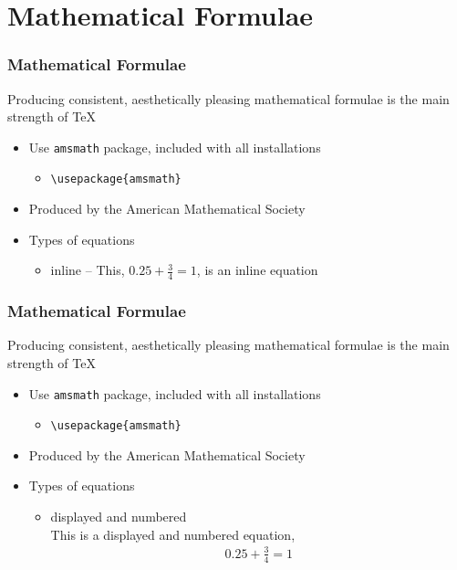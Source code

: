 \documentclass[11pt]{beamer}
\begin{document}
\section{Mathematical Formulae}
\begin{frame}[fragile]\frametitle{Mathematical Formulae}
Producing consistent, aesthetically pleasing mathematical formulae is the main strength of \TeX
\begin{itemize}
	\item Use \verb+amsmath+ package, included with all installations
	\begin{itemize}
		\item \verb+\usepackage{amsmath}+
	\end{itemize}
	\item Produced by the American Mathematical Society
	\item Types of equations
	\begin{itemize}
		\item<2> inline -- This, $0.25+\frac{3}{4}=1$, is an inline equation
	\end{itemize}
\end{itemize}
\end{frame}

\begin{frame}[fragile]\frametitle{Mathematical Formulae}
Producing consistent, aesthetically pleasing mathematical formulae is the main strength of \TeX
\begin{itemize}
	\item Use \verb+amsmath+ package, included with all installations
	\begin{itemize}
		\item \verb+\usepackage{amsmath}+
	\end{itemize}
	\item Produced by the American Mathematical Society
	\item Types of equations
	\begin{itemize}
		\item displayed and numbered \\
			This is a displayed and numbered equation,
			\begin{align}
				0.25+\frac{3}{4}=1
			\end{align}
	\end{itemize}
\end{itemize}
\end{frame}
\end{document}
